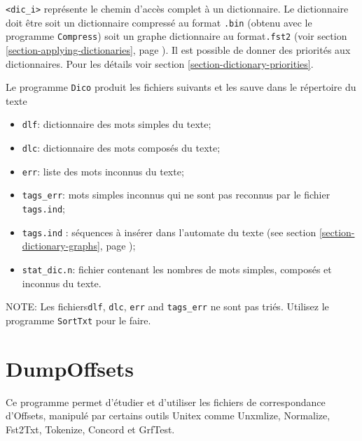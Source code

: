 \bigskip
\noindent \verb+<dic_i>+ représente le chemin d’accès complet à un dictionnaire. Le dictionnaire
doit être soit un dictionnaire compressé au format \verb+.bin+ (obtenu avec le programme
	\verb+Compress+) soit un graphe dictionnaire au format\verb+.fst2+ (voir section
\ref{section-applying-dictionaries}, page \pageref{section-applying-dictionaries}).
	 Il est possible de donner des priorités aux dictionnaires. Pour
	les détails voir section \ref{section-dictionary-priorities}.

\bigskip
\noindent Le programme \verb+Dico+ produit les fichiers suivants et les sauve dans le répertoire du
texte

\begin{itemize}
  \item \verb+dlf+: dictionnaire des mots simples du texte;
  \item \verb+dlc+: dictionnaire des mots composés du texte;
  \item \verb+err+: liste des mots inconnus du texte;
  \item \verb+tags_err+: mots simples inconnus qui ne sont pas reconnus par le fichier
  	  \verb+tags.ind+;
  \item \verb+tags.ind+ : séquences à insérer dans l'automate du texte
  (see section \ref{section-dictionary-graphs}, page \pageref{section-dictionary-graphs});
  \item \verb+stat_dic.n+: fichier contenant les nombres de mots simples, composés et inconnus du
  	  texte.
\end{itemize}

\bigskip
\noindent NOTE: Les fichiers\verb+dlf+, \verb+dlc+, \verb+err+ and \verb+tags_err+ ne sont pas triés. Utilisez le programme \verb+SortTxt+ pour le faire.





\section{DumpOffsets}
\label{section-DumpOffsets}

\noindent Ce programme permet d'étudier et d'utiliser les fichiers de correspondance d'Offsets, manipulé par
certains outils Unitex comme Unxmlize, Normalize, Fst2Txt, Tokenize, Concord et GrfTest.

